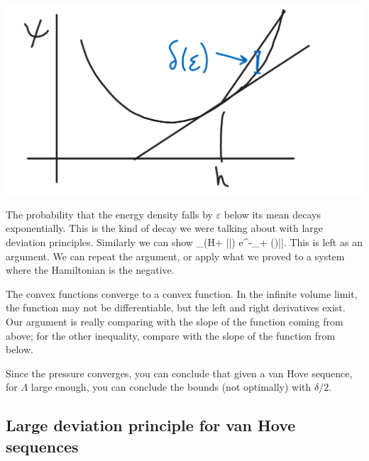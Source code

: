 \documentclass[12pt]{book}
\theoremstyle{norm}
\begin{document}
\begin{center}\includegraphics[scale=.25]{images/9-1}\end{center}

The probability that the energy density falls by $\varepsilon$ below its mean decays exponentially. This is the kind of decay we were talking about with large deviation principles.
Similarly we can show 
\be
{}_\beta (H\ge \left{}\right\rangle + \varepsilon|\Lambda|) \le e^{-\delta_+ (\varepsilon)|\Lambda|}.
\ee
This is left as an argument. 
We can repeat the argument, or apply what we proved to a system where the Hamiltonian is the negative.

The convex functions converge to a convex function. %
In the infinite volume limit, the function may not be differentiable, but the left and right derivatives exist. Our argument is really comparing with the slope of the function coming from above; for the other inequality, compare with the slope of the function from below.

Since the pressure converges, 
you can conclude that given a van Hove sequence, for $\Lambda$ large enough, you can conclude the bounds (not optimally) with $\delta/2$. 

\subsection{Large deviation principle for van Hove sequences}
\end{document}
